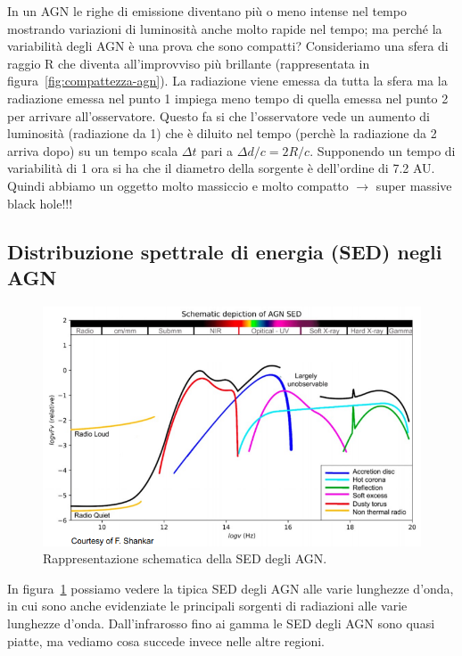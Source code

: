 In un AGN le righe di emissione diventano più o meno intense nel tempo mostrando variazioni di luminosità anche molto rapide nel tempo; ma perché la variabilità degli AGN è una prova che sono compatti? Consideriamo una sfera di raggio R che diventa all’improvviso più brillante (rappresentata in figura~\ref{fig:compattezza-agn}). La radiazione viene emessa da tutta la sfera ma la radiazione emessa nel punto 1 impiega meno tempo di quella emessa nel punto 2 per arrivare all’osservatore. Questo fa si che l’osservatore vede un aumento di luminosità (radiazione da 1) che è diluito nel tempo (perchè la radiazione da 2 arriva dopo) su un tempo scala $\Delta t$ pari a $\Delta d/c = 2R/c$. Supponendo un tempo di variabilità di 1 ora si ha che il diametro della sorgente è dell’ordine di 7.2 AU. Quindi abbiamo un oggetto molto massiccio e molto compatto $\rightarrow$ super massive black hole!!!

\subsection{Distribuzione spettrale di energia (SED) negli AGN}

\begin{figure}
    \centering
    \includegraphics[width = 0.8 \textwidth]{immagini/sed-agn.png}
    \caption{Rappresentazione schematica della SED degli AGN.}
    \label{fig:sed-agn}
\end{figure}
In figura~\ref{fig:sed-agn} possiamo vedere la tipica SED degli AGN alle varie lunghezze d’onda, in cui sono anche evidenziate le principali sorgenti di radiazioni alle varie lunghezze d'onda. Dall’infrarosso fino ai gamma le SED degli AGN sono quasi piatte, ma vediamo cosa succede invece nelle altre regioni.

